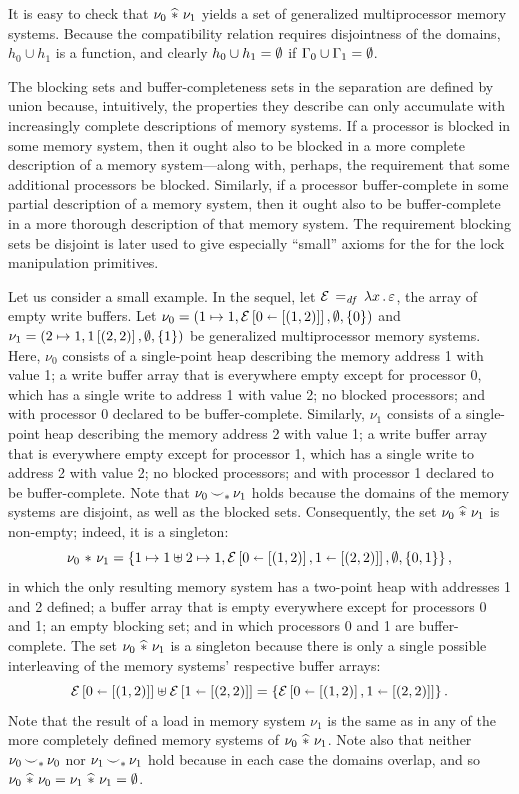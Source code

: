 \documentclass[11pt]{report}
\begin{document}
It is easy to check that $\nu_0 \operatorname{\,\widehat{\ast}\,} \nu_1$ yields a set of generalized multiprocessor memory systems. Because the compatibility relation requires disjointness of the domains, $h_0 \cup h_1$ is a function, and clearly $h_0 \cup h_1 = \operatorname{\emptyset}$ if $\Gamma_0 \cup \Gamma_1 = \operatorname{\emptyset}$. 

The blocking sets and buffer-completeness sets in the separation are defined by union because, intuitively, the properties they describe can only accumulate with increasingly complete descriptions of memory systems. If a processor is blocked in some memory system, then it ought also to be blocked in a more complete description of a memory system---along with, perhaps, the requirement that some additional processors be blocked. Similarly, if a processor buffer-complete in some partial description of a memory system, then it ought also to be buffer-complete in a more thorough description of that memory system. The requirement blocking sets be disjoint is later used to give especially ``small'' axioms for the for the lock manipulation primitives. 

Let us consider a small example. In the sequel, let $\mathcal{E} \operatorname{\;=_{\mathit{df}}\;} \lambda x\,.\, \varepsilon$, the array of empty write buffers. Let $\nu_0 = (1 \mapsto 1, \mathcal{E} \left[ 0 \shortleftarrow \left[(1,2)\right] \right],\operatorname{\emptyset},\left\lbrace 0 \right\rbrace)$ and $\nu_1 = (2 \mapsto 1, 1 \left[ (2,2) \right],\operatorname{\emptyset},\left\lbrace 1 \right\rbrace)$ be generalized multiprocessor memory systems. Here, $\nu_0$ consists of a single-point heap describing the memory address 1 with value 1; a write buffer array that is everywhere empty except for processor 0, which has a single write to address 1 with value 2; no blocked processors; and with processor 0 declared to be buffer-complete. Similarly, $\nu_1$ consists of a single-point heap describing the memory address 2 with value 1; a write buffer array that is everywhere empty except for processor 1, which has a single write to address 2 with value 2; no blocked processors; and with processor 1 declared to be buffer-complete. Note that $\nu_0 \operatorname{\smile}_\ast \nu_1$ holds because the domains of the memory systems are disjoint, as well as the blocked sets. Consequently, the set $\nu_0 \operatorname{\,\widehat{\ast}\,} \nu_1$ is non-empty; indeed, it is a singleton: \[ \nu_0 \operatorname{\,\ast\,} \nu_1 = \left\lbrace 1 \mapsto 1 \uplus 2 \mapsto 1, \mathcal{E} \left[ 0 \shortleftarrow \left[(1,2)\right], 1 \shortleftarrow \left[(2,2)\right] \right],\operatorname{\emptyset},\left\lbrace 0,1 \right\rbrace \right\rbrace,\] in which the only resulting memory system has a two-point heap with addresses 1 and 2 defined; a buffer array that is empty everywhere except for processors 0 and 1; an empty blocking set; and in which processors 0 and 1 are buffer-complete. The set $\nu_0 \operatorname{\,\widehat{\ast}\,} \nu_1$ is a singleton because there is only a single possible interleaving of the memory systems' respective buffer arrays: \[\mathcal{E} \left[ 0 \shortleftarrow \left[(1,2)\right] \right] \uplus \mathcal{E} \left[ 1 \shortleftarrow \left[(2,2)\right] \right] = \left\lbrace  \mathcal{E} \left[ 0 \shortleftarrow \left[(1,2)\right], 1 \shortleftarrow \left[(2,2)\right] \right] \right\rbrace.\] Note that the result of a load in memory system $\nu_1$ is the same as in any of the more completely defined memory systems of $\nu_0 \operatorname{\,\widehat{\ast}\,} \nu_1$. Note also that neither $\nu_0 \operatorname{\smile}_\ast \nu_0$ nor $\nu_1 \operatorname{\smile}_\ast \nu_1$ hold because in each case the domains overlap, and so $\nu_0 \operatorname{\,\widehat{\ast}\,} \nu_0 = \nu_1 \operatorname{\,\widehat{\ast}\,} \nu_1 = \operatorname{\emptyset}$. 
\end{document}
